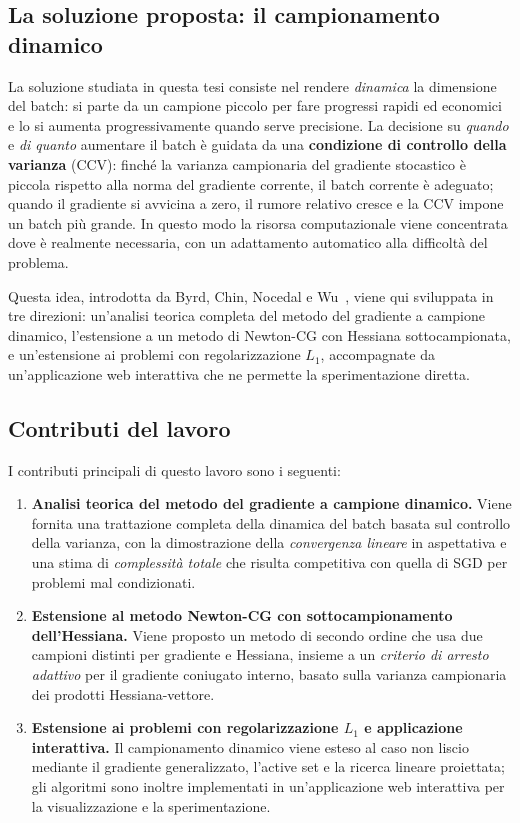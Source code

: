 \subsection{La soluzione proposta: il campionamento dinamico}

La soluzione studiata in questa tesi consiste nel rendere \emph{dinamica} la
dimensione del batch: si parte da un campione piccolo per fare progressi rapidi
ed economici e lo si aumenta progressivamente quando serve precisione. La
decisione su \emph{quando} e \emph{di quanto} aumentare il batch è guidata da
una \textbf{condizione di controllo della varianza} (CCV): finché la varianza
campionaria del gradiente stocastico è piccola rispetto alla norma del
gradiente corrente, il batch corrente è adeguato; quando il gradiente si
avvicina a zero, il rumore relativo cresce e la CCV impone un batch più grande.
In questo modo la risorsa computazionale viene concentrata dove è realmente
necessaria, con un adattamento automatico alla difficoltà del problema.

Questa idea, introdotta da Byrd, Chin, Nocedal e Wu~\cite{byrd2012}, viene
qui sviluppata in tre direzioni: un'analisi teorica completa del metodo del
gradiente a campione dinamico, l'estensione a un metodo di Newton-CG con
Hessiana sottocampionata, e un'estensione ai problemi con regolarizzazione
$L_1$, accompagnate da un'applicazione web interattiva che ne permette la
sperimentazione diretta.

\subsection{Contributi del lavoro}

I contributi principali di questo lavoro sono i seguenti:

\begin{enumerate}
  \item \textbf{Analisi teorica del metodo del gradiente a campione dinamico.}
  Viene fornita una trattazione completa della dinamica del batch basata sul
  controllo della varianza, con la dimostrazione della \emph{convergenza
  lineare} in aspettativa e una stima di \emph{complessità totale} che risulta
  competitiva con quella di SGD per problemi mal condizionati.
  \item \textbf{Estensione al metodo Newton-CG con sottocampionamento
  dell'Hessiana.} Viene proposto un metodo di secondo ordine che usa due
  campioni distinti per gradiente e Hessiana, insieme a un \emph{criterio di
  arresto adattivo} per il gradiente coniugato interno, basato sulla varianza
  campionaria dei prodotti Hessiana-vettore.
  \item \textbf{Estensione ai problemi con regolarizzazione $L_1$ e
  applicazione interattiva.} Il campionamento dinamico viene esteso al caso
  non liscio mediante il gradiente generalizzato, l'active set e la ricerca
  lineare proiettata; gli algoritmi sono inoltre implementati in un'applicazione
  web interattiva per la visualizzazione e la sperimentazione.
\end{enumerate}

